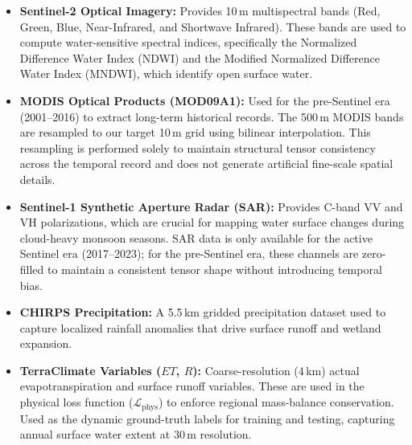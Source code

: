 \documentclass[preprint,12pt]{elsarticle}
\begin{document}
\begin{table}[htbp]
\caption{Spatiotemporal Data Ingestion Timeline and Multi-Sensor Alignment Epochs}
\label{tab:timeline}
\centering
\small
{}
\end{table}

\begin{itemize}
    \item \textbf{Sentinel-2 Optical Imagery:} Provides 10\,m multispectral bands (Red, Green, Blue, Near-Infrared, and Shortwave Infrared). These bands are used to compute water-sensitive spectral indices, specifically the Normalized Difference Water Index (NDWI) and the Modified Normalized Difference Water Index (MNDWI), which identify open surface water.
    \item \textbf{MODIS Optical Products (MOD09A1):} Used for the pre-Sentinel era (2001--2016) to extract long-term historical records. The 500\,m MODIS bands are resampled to our target 10\,m grid using bilinear interpolation. This resampling is performed solely to maintain structural tensor consistency across the temporal record and does not generate artificial fine-scale spatial details.
    \item \textbf{Sentinel-1 Synthetic Aperture Radar (SAR):} Provides C-band VV and VH polarizations, which are crucial for mapping water surface changes during cloud-heavy monsoon seasons. SAR data is only available for the active Sentinel era (2017--2023); for the pre-Sentinel era, these channels are zero-filled to maintain a consistent tensor shape without introducing temporal bias.
    \item \textbf{CHIRPS Precipitation:} A 5.5\,km gridded precipitation dataset used to capture localized rainfall anomalies that drive surface runoff and wetland expansion.
    \item \textbf{TerraClimate Variables ($ET$, $R$):} Coarse-resolution (4\,km) actual evapotranspiration and surface runoff variables. These are used in the physical loss function ($\mathcal{L}_{\text{phys}}$) to enforce regional mass-balance conservation.
     Used as the dynamic ground-truth labels for training and testing, capturing annual surface water extent at 30\,m resolution.
\end{itemize}
\end{document}
